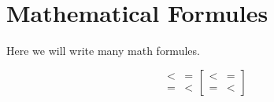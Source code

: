 \section{Mathematical Formules}

Here we will write many math formules.

\begin{equation*}
    \begin{matrix}
        < & = \\
        = & < 
    \end{matrix}
    \begin{bmatrix}
        < & = \\
        = & < 
    \end{bmatrix}
\end{equation*}

